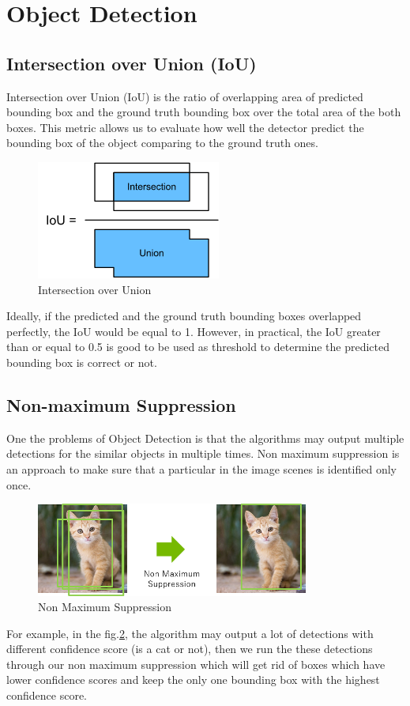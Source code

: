 \pagebreak
\section{Object Detection}
\subsection{Intersection over Union (IoU)}
\hspace{0.5cm}Intersection over Union (IoU) is the ratio of overlapping area of predicted bounding box and the ground truth bounding box over the total area of the both boxes. This metric allows us to evaluate how well the detector predict the bounding box of the object comparing to the ground truth ones.
\begin{figure}[h!]
    \centering
    \includegraphics[scale=1]{Chapters/Fig/iou.png}
    \caption{Intersection over Union}
    \label{fig:iou}
\end{figure}\par

Ideally, if the predicted and the ground truth bounding boxes overlapped perfectly, the IoU would be equal to 1. However, in practical, the IoU greater than or equal to 0.5 is good to be used as threshold to determine the predicted bounding box is correct or not.
\subsection{Non-maximum Suppression}
\hspace{0.5cm}One the problems of Object Detection is that the algorithms may output multiple detections for the similar objects in multiple times. Non maximum suppression is an approach to make sure that a particular in the image scenes is identified only once.
\begin{figure}[h!]
    \centering
    \includegraphics[width=0.8\textwidth]{Chapters/Fig/nms.png}
    \caption{Non Maximum Suppression}
    \label{fig:nms}
\end{figure}\par
For example, in the fig.\ref{fig:nms}, the algorithm may output a lot of detections with different confidence score (is a cat or not), then we run the these detections through our non maximum suppression which will get rid of boxes which have lower confidence scores and keep the only one bounding box with the highest confidence score.
\pagebreak
